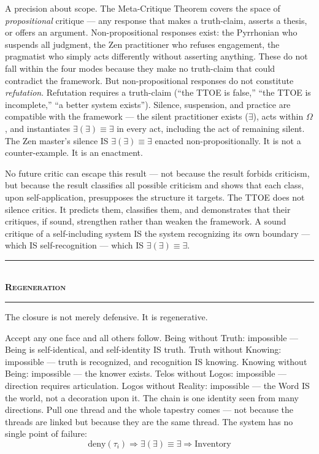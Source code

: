 \documentclass[10pt, openany, oneside]{book}
\renewcommand{\normalsize}{\fontsize{10}{13}\selectfont}
\begin{document}
A precision about scope. The Meta-Critique Theorem covers the space of \textit{propositional} critique --- any response that makes a truth-claim, asserts a thesis, or offers an argument. Non-propositional responses exist: the Pyrrhonian who suspends all judgment, the Zen practitioner who refuses engagement, the pragmatist who simply acts differently without asserting anything. These do not fall within the four modes because they make no truth-claim that could contradict the framework. But non-propositional responses do not constitute \textit{refutation}. Refutation requires a truth-claim (``the TTOE is false,'' ``the TTOE is incomplete,'' ``a better system exists''). Silence, suspension, and practice are compatible with the framework --- the silent practitioner exists ($\exists$), acts within $\Omega$, and instantiates $\exists(\exists) \equiv \exists$ in every act, including the act of remaining silent. The Zen master's silence IS $\exists(\exists) \equiv \exists$ enacted non-propositionally. It is not a counter-example. It is an enactment.

No future critic can escape this result --- not because the result forbids criticism, but because the result classifies all possible criticism and shows that each class, upon self-application, presupposes the structure it targets. The TTOE does not silence critics. It predicts them, classifies them, and demonstrates that their critiques, if sound, strengthen rather than weaken the framework. A sound critique of a self-including system IS the system recognizing its own boundary --- which IS self-recognition --- which IS $\exists(\exists) \equiv \exists$.

\vspace{1.5em}


\begin{center}
    \rule{0.3\textwidth}{0.4pt}\\[0.5em]
    {\normalsize\bfseries\scshape Regeneration}\\[0.3em]
    \rule{0.3\textwidth}{0.4pt}
\end{center}

\vspace{1em}

\noindent The closure is not merely defensive. It is regenerative.

Accept any one face and all others follow. Being without Truth: impossible --- Being is self-identical, and self-identity IS truth. Truth without Knowing: impossible --- truth is recognized, and recognition IS knowing. Knowing without Being: impossible --- the knower exists. Telos without Logos: impossible --- direction requires articulation. Logos without Reality: impossible --- the Word IS the world, not a decoration upon it. The chain is one identity seen from many directions. Pull one thread and the whole tapestry comes --- not because the threads are linked but because they are the same thread. The system has no single point of failure:
$$\text{deny}(\tau_i) \Rightarrow \exists(\exists) \equiv \exists \Rightarrow \text{Inventory}$$
\end{document}
